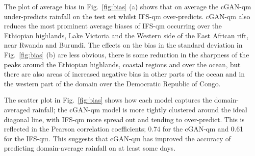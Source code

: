 \documentclass{article}
\begin{document}
The plot of average bias in Fig.~\ref{fig:bias} (a) shows that on average the cGAN-qm under-predicts rainfall on the test set whilst IFS-qm over-predicts. cGAN-qm also reduces the most prominent average biases of IFS-qm occurring over the Ethiopian highlands, Lake Victoria and the Western side of the East African rift, near Rwanda and Burundi. The effects on the bias in the standard deviation in Fig.~\ref{fig:bias} (b) are less obvious, there is some reduction in the sharpness of the peaks around the Ethiopian highlands, coastal regions and over the ocean, but there are also areas of increased negative bias in other parts of the ocean and in the western part of the domain over the Democratic Republic of Congo. 

The scatter plot in Fig.~\ref{fig:bias} shows how each model captures the domain-averaged rainfall; the cGAN-qm model is more tightly clustered around the ideal diagonal line, with IFS-qm more spread out and tending to over-predict. This is reflected in the Pearson correlation coefficients; 0.74 for the cGAN-qm and 0.61 for the IFS-qm. This suggests that cGAN-qm has improved the accuracy of predicting domain-average rainfall on at least some days.
\end{document}
